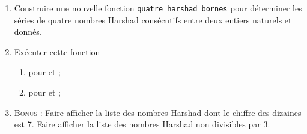 \begin{enumerate}[\bfseries 1.]
\item Construire une nouvelle fonction \texttt{quatre\_harshad\_bornes} pour déterminer les séries de quatre nombres Harshad consécutifs entre deux entiers naturels  et  donnés.	

\item 	Exécuter cette fonction
		\begin{enumerate}[--]
			\item 	pour  et ;
			\item 	pour  et ;
		\end{enumerate}

\item \textsc{Bonus :} Faire afficher la liste des nombres Harshad dont le chiffre des dizaines est 7. Faire afficher la liste des nombres Harshad non divisibles par 3.
\end{enumerate}


